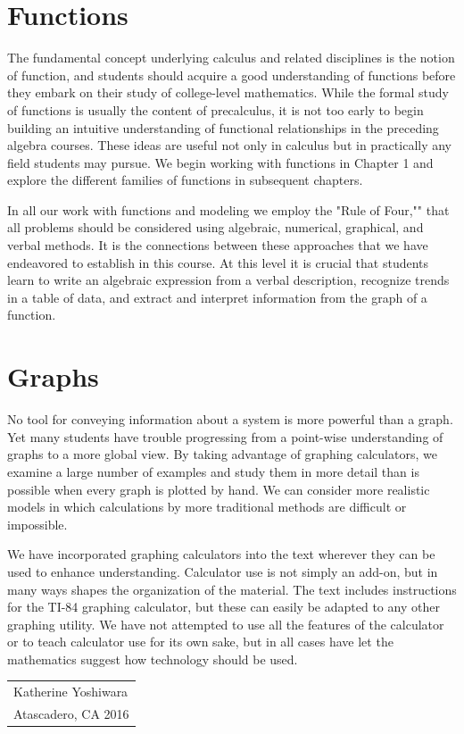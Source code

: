 \documentclass[10pt,]{book}
\theoremstyle{plain}
\theoremstyle{definition}
\theoremstyle{definition}
\theoremstyle{definition}
\theoremstyle{definition}
\numberwithin{equation}{part}
\begin{document}
\section[{Functions}]{Functions}\label{section-2}
The fundamental concept underlying calculus and related disciplines is the notion of function, and students should acquire a good understanding of functions before they embark on their study of college-level mathematics. While the formal study of functions is usually the content of precalculus, it is not too early to begin building an intuitive understanding of functional relationships in the preceding algebra courses. These ideas are useful not only in calculus but in practically any field students may pursue. We begin working with functions in Chapter 1 and explore the different families of functions in subsequent chapters.%
\par
In all our work with functions and modeling we employ the "Rule of Four,"" that all problems should be considered using algebraic, numerical, graphical, and verbal methods. It is the connections between these approaches that we have endeavored to establish in this course. At this level it is crucial that students learn to write an algebraic expression from a verbal description, recognize trends in a table of data, and extract and interpret information from the graph of a function.%
\typeout{************************************************}
\typeout{************************************************}
\section[{Graphs}]{Graphs}\label{section-3}
No tool for conveying information about a system is more powerful than a graph. Yet many students have trouble progressing from a point-wise understanding of graphs to a more global view. By taking advantage of graphing calculators, we examine a large number of examples and study them in more detail than is possible when every graph is plotted by hand. We can consider more realistic models in which calculations by more traditional methods are difficult or impossible.%
\par
We have incorporated graphing calculators into the text wherever they can be used to enhance understanding. Calculator use is not simply an add-on, but in many ways shapes the organization of the material. The text includes instructions for the TI-84 graphing calculator, but these can easily be adapted to any other graphing utility. We have not attempted to use all the features of the calculator or to teach calculator use for its own sake, but in all cases have let the mathematics suggest how technology should be used.%
%
\par\hfill\begin{tabular}{l@{}}
Katherine Yoshiwara\\
Atascadero, CA 2016
\end{tabular}\\\par
\end{document}
